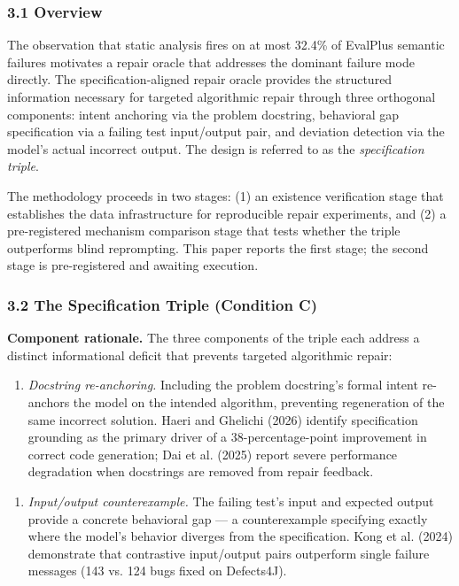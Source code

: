
\subsubsection{3.1 Overview}

The observation that static analysis fires on at most 32.4\% of EvalPlus semantic failures motivates a repair oracle that addresses the dominant failure mode directly. The specification-aligned repair oracle provides the structured information necessary for targeted algorithmic repair through three orthogonal components: intent anchoring via the problem docstring, behavioral gap specification via a failing test input/output pair, and deviation detection via the model's actual incorrect output. The design is referred to as the \textit{specification triple}.

The methodology proceeds in two stages: (1) an existence verification stage that establishes the data infrastructure for reproducible repair experiments, and (2) a pre-registered mechanism comparison stage that tests whether the triple outperforms blind reprompting. This paper reports the first stage; the second stage is pre-registered and awaiting execution.

\subsubsection{3.2 The Specification Triple (Condition C)}

\textbf{Component rationale.} The three components of the triple each address a distinct informational deficit that prevents targeted algorithmic repair:

\begin{enumerate}
\item \textit{Docstring re-anchoring.} Including the problem docstring's formal intent re-anchors the model on the intended algorithm, preventing regeneration of the same incorrect solution. Haeri and Ghelichi (2026) identify specification grounding as the primary driver of a 38-percentage-point improvement in correct code generation; Dai et al. (2025) report severe performance degradation when docstrings are removed from repair feedback.
\end{enumerate}

\begin{enumerate}
\item \textit{Input/output counterexample.} The failing test's input and expected output provide a concrete behavioral gap --- a counterexample specifying exactly where the model's behavior diverges from the specification. Kong et al. (2024) demonstrate that contrastive input/output pairs outperform single failure messages (143 vs. 124 bugs fixed on Defects4J).
\end{enumerate}

